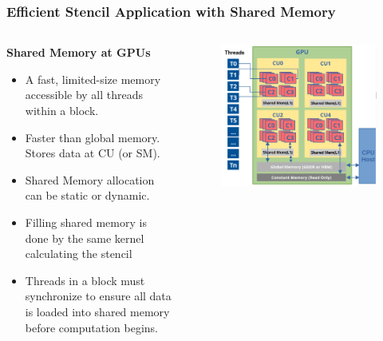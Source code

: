 \documentclass[9pt]{beamer}
\begin{document}
\begin{frame}[fragile]
\frametitle{Efficient Stencil Application with Shared Memory}
\begin{columns} %
\vspace{-1.3cm}
\hspace*{-0.6cm} %
\begin{column}{0.56\textwidth}

\textbf{Shared Memory at GPUs}
    \begin{itemize}
        \item A fast, limited-size memory accessible by all threads within a block.
        \item Faster than global memory. Stores data at CU (or SM).
        \item Shared Memory allocation can be static or dynamic.
         \item Filling shared memory is done by the same kernel calculating the stencil
         \item Threads in a block must synchronize to ensure all data is loaded into shared memory before computation begins.
   \end{itemize}
\end{column}
\begin{column}{0.44\textwidth}
\begin{figure}
    \centering
    \includegraphics[width=0.96\linewidth]{Screenshot from 2024-10-18 20-08-56.png}
    \label{fig:enter-label}
\end{figure}

\end{column}
\end{columns}

\end{frame}
\end{document}
